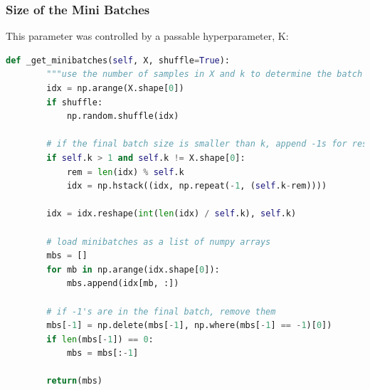 \documentclass[reqno]{amsart}
\theoremstyle{definition}
\theoremstyle{remark}
\numberwithin{equation}{section}
\begin{document}
\subsubsection{Size of the Mini Batches}

This parameter was controlled by a passable hyperparameter, K:

\begin{lstlisting}[language=Python]
    def _get_minibatches(self, X, shuffle=True):                                
        """use the number of samples in X and k to determine the batch size"""  
        idx = np.arange(X.shape[0])                                             
        if shuffle:                                                             
            np.random.shuffle(idx)                                              
                                                                                
        # if the final batch size is smaller than k, append -1s for reshape     
        if self.k > 1 and self.k != X.shape[0]:                                 
            rem = len(idx) % self.k                                             
            idx = np.hstack((idx, np.repeat(-1, (self.k-rem))))                 
                                                                                
        idx = idx.reshape(int(len(idx) / self.k), self.k)                       
                                                                                
        # load minibatches as a list of numpy arrays                            
        mbs = []                                                                
        for mb in np.arange(idx.shape[0]):                                      
            mbs.append(idx[mb, :])                                              
                                                                                
        # if -1's are in the final batch, remove them                           
        mbs[-1] = np.delete(mbs[-1], np.where(mbs[-1] == -1)[0])                
        if len(mbs[-1]) == 0:                                                   
            mbs = mbs[:-1]                                                      
                                                                                
        return(mbs)    
\end{lstlisting}
\end{document}

